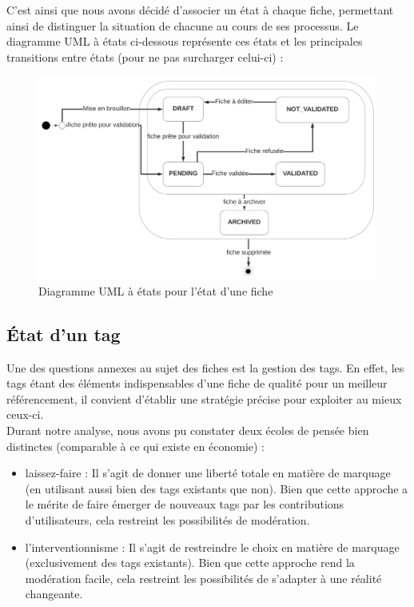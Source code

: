 C'est ainsi que nous avons décidé d'associer un état à chaque \gls{fiche}, permettant ainsi de distinguer la situation de chacune au cours de ses processus. Le diagramme UML à états ci-dessous représente ces états et les principales transitions entre états (pour ne pas surcharger celui-ci) :

\begin{figure}[H]
    \includegraphics[width=\textwidth,height=\textheight,keepaspectratio]{images/StateFiches.png}
    \centering
    \caption{Diagramme UML à états pour l'état d'une \gls{fiche}}
    \label{pic:stateDiagramForFiches}
\end{figure}

\subsection*{État d'un \gls{tag}}

Une des questions annexes au sujet des \glspl{fiche} est la gestion des \glspl{tag}. En effet, les \glspl{tag} étant des éléments indispensables d'une \gls{fiche} de qualité pour un meilleur référencement, il convient d'établir une stratégie précise pour exploiter au mieux ceux-ci. \\

Durant notre analyse, nous avons pu constater deux écoles de pensée bien distinctes (comparable à ce qui existe en économie) : 
\begin{itemize}
    \item laissez-faire : Il s'agit de donner une liberté totale en matière de marquage (en utilisant aussi bien des \glspl{tag} existants que non). Bien que cette approche a le mérite de faire émerger de nouveaux \glspl{tag} par les contributions d'utilisateurs, cela restreint les possibilités de modération.
    \item l'interventionnisme : Il s'agit de restreindre le choix en matière de marquage (exclusivement des \glspl{tag} existants). Bien que cette approche rend la modération facile, cela restreint les possibilités de s'adapter à une réalité changeante.
\end{itemize}

